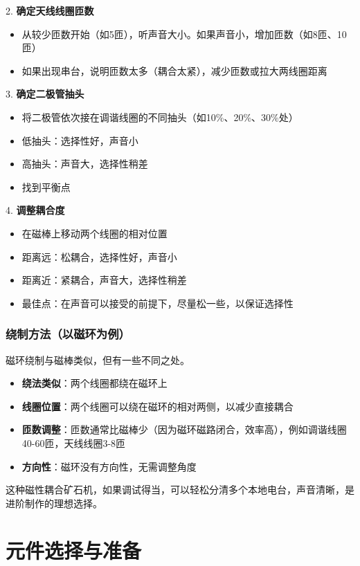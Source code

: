 \documentclass[12pt,UTF8]{ctexbook}
\begin{document}
2. \textbf{确定天线线圈匝数}
\begin{itemize}[leftmargin=3.5em]
	\item 从较少匝数开始（如5匝），听声音大小。如果声音小，增加匝数（如8匝、10匝）
	\item 如果出现串台，说明匝数太多（耦合太紧），减少匝数或拉大两线圈距离
\end{itemize}

3. \textbf{确定二极管抽头}
\begin{itemize}[leftmargin=3.5em]
	\item 将二极管依次接在调谐线圈的不同抽头（如10\%、20\%、30\%处）
	\item 低抽头：选择性好，声音小
	\item 高抽头：声音大，选择性稍差
	\item 找到平衡点
\end{itemize}

4. \textbf{调整耦合度}
\begin{itemize}[leftmargin=3.5em]
	\item 在磁棒上移动两个线圈的相对位置
	\item 距离远：松耦合，选择性好，声音小
	\item 距离近：紧耦合，声音大，选择性稍差
	\item 最佳点：在声音可以接受的前提下，尽量松一些，以保证选择性
\end{itemize}

\subsubsection{绕制方法（以磁环为例）}

磁环绕制与磁棒类似，但有一些不同之处。

\begin{itemize}[leftmargin=3.5em]
	\item \textbf{绕法类似}：两个线圈都绕在磁环上
	\item \textbf{线圈位置}：两个线圈可以绕在磁环的相对两侧，以减少直接耦合
	\item \textbf{匝数调整}：匝数通常比磁棒少（因为磁环磁路闭合，效率高），例如调谐线圈40-60匝，天线线圈3-8匝
	\item \textbf{方向性}：磁环没有方向性，无需调整角度
\end{itemize}

这种磁性耦合矿石机，如果调试得当，可以轻松分清多个本地电台，声音清晰，是进阶制作的理想选择。

\section{元件选择与准备}
\end{document}
